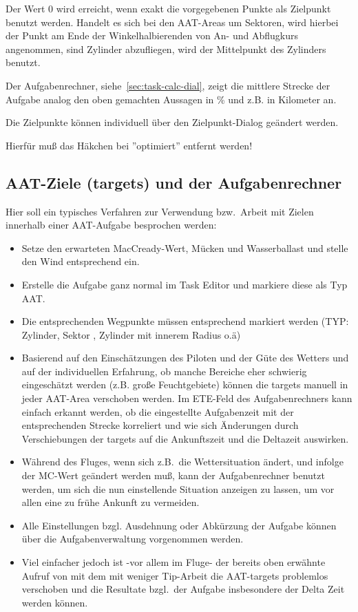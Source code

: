 Der Wert 0 wird erreicht, wenn exakt die vorgegebenen Punkte als Zielpunkt benutzt werden.  Handelt es sich bei den AAT-Areas um Sektoren, wird hierbei der Punkt am Ende der Winkelhalbierenden von An- und Abflugkurs  angenommen, sind Zylinder abzufliegen, wird der Mittelpunkt des Zylinders benutzt.

Der Aufgabenrechner, siehe~\ref{sec:task-calc-dial}, zeigt die mittlere Strecke der Aufgabe analog den oben gemachten Aussagen in \% und z.B. in Kilometer an.

Die Zielpunkte können individuell über den Zielpunkt-Dialog geändert werden. 
 
Hierfür muß das Häkchen bei ''optimiert'' entfernt werden! \achtung


\subsection*{AAT-Ziele (targets) und der Aufgabenrechner}
Hier soll ein typisches Verfahren zur Verwendung bzw.\ Arbeit mit Zielen innerhalb einer AAT-Aufgabe besprochen werden:
\begin{itemize}
\item Setze den erwarteten MacCready-Wert, Mücken und Wasserballast und stelle den Wind entsprechend ein.
\item Erstelle die Aufgabe ganz normal im Task Editor und markiere diese als Typ AAT.
\item  Die entsprechenden Wegpunkte müssen entsprechend markiert werden (TYP: Zylinder, Sektor , Zylinder mit innerem Radius o.ä)
\item Basierend auf den Einschätzungen des Piloten und der Güte des Wetters und auf der individuellen Erfahrung, ob manche Bereiche eher schwierig eingeschätzt werden (z.B. große Feuchtgebiete) können die targets manuell in jeder AAT-Area verschoben werden.
Im \textsf{ETE}-Feld des Aufgabenrechners kann einfach erkannt werden, ob die eingestellte Aufgabenzeit mit der entsprechenden Strecke korreliert und wie sich Änderungen durch Verschiebungen der targets auf die Ankunftszeit und die Deltazeit  auswirken.
\item Während des Fluges, wenn sich z.B.\ die Wettersituation ändert, und infolge der MC-Wert geändert werden muß,  kann der Aufgabenrechner benutzt werden, um sich die nun  einstellende Situation anzeigen zu lassen, um vor allen eine zu frühe Ankunft zu vermeiden.
\item Alle Einstellungen bzgl. Ausdehnung oder Abkürzung der Aufgabe können über die Aufgabenverwaltung vorgenommen werden.
\item \textcolor[rgb]{0.00,0.25,0.50}{\textsf{Viel einfacher jedoch ist -vor allem im Fluge- der bereits oben erwähnte Aufruf von}}
\blink{}\blink{}
mit dem mit weniger Tip-Arbeit die AAT-targets problemlos verschoben und die Resultate bzgl.\ der Aufgabe insbesondere der Delta Zeit werden können.
\end{itemize}
